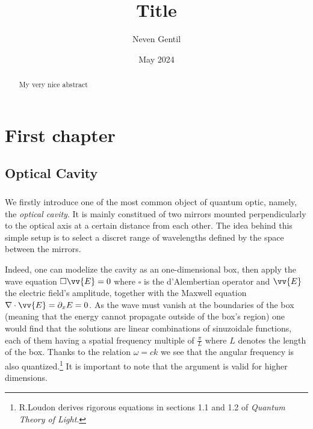 \documentclass[10pt]{report}
\begin{document}
\title{Title}
\author{Neven Gentil}
\date{May 2024}
\maketitle

\begin{abstract}
My very nice abstract
\end{abstract}

\chapter{First chapter}
\section{Optical Cavity}
\paragraph{}
We firstly introduce one of the most common object of quantum optic, namely, the \textit{optical cavity}. It is mainly constitued of two mirrors mounted perpendicularly to the optical axis at a certain distance from each other. The idea behind this simple setup is to select a discret range of wavelengths defined by the space between the mirrors. 

Indeed, one can modelize the cavity as an one-dimensional box, then apply the wave equation $ \square \vv{E} = 0$ where $\square$ is the d'Alembertian operator and $\vv{E}$ the electric field's amplitude, together with the Maxwell equation $\nabla \cdot \vv{E} = \partial _x E = 0$. As the wave must vanish at the boundaries of the box (meaning that the energy cannot propagate outside of the box's region) one would find that the solutions are linear combinations of sinuzoidale functions, each of them having a spatial frequency multiple of $\frac{\pi}{L}$ where $L$ denotes the length of the box. Thanks to the relation $\omega = ck$ we see that the angular frequency is also quantized.\footnote{R.Loudon derives rigorous equations in sections 1.1 and 1.2 of \textit{Quantum Theory of Light}.} It is important to note that the argument is valid for higher dimensions.
\end{document}
